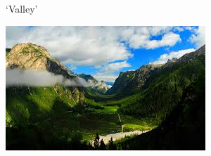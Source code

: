 \documentclass[10pt]{beamer}
\begin{document}
                                                                                              \begin{frame}{`Valley'}
                                                                                                \begin{center}
                                                                                                  \includegraphics{valley.jpeg}
                                                                                                \end{center}
                                                                                              \end{frame}
\end{document}
